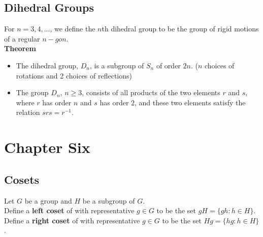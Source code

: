 \documentclass{article}
\begin{document}
\subsection{Dihedral Groups}
For $n=3,4,...$, we define the $n$th dihedral group to be the group of rigid motions of a regular $n-gon$. \\
\textbf{Theorem}
\begin{itemize}
    \item The dihedral group, $D_n$, is a subgroup of $S_n$ of order $2n$. ($n$ choices of rotations and 2 choices of reflections)
    \item The group $D_n$, $n\geq 3$, consists of all products of the two elements $r$ and $s$, where $r$ has order $n$ and $s$ has order $2$, and these two elements satisfy the relation $srs=r^{-1}$.
\end{itemize}

\section{Chapter Six}
\subsection{Cosets}
Let $G$ be a group and $H$ be a subgroup of $G$. \\
Define a \textbf{left coset} of with representative $g\in G$ to be the set $gH=\{gh: h\in H\}$.\\
Define a \textbf{right coset} of with representative $g\in G$ to be the set $Hg=\{hg: h\in H\}$.
\end{document}

